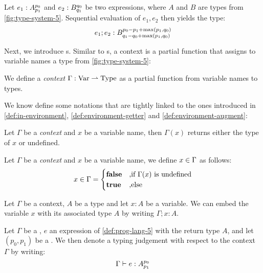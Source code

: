 \begin{definition}
   Let \(e_1 : A ^{p_0}_{p_1}\) and \(e_2 : B ^{q_0}_{q_1}\) be two expressions, where \(A\) and \(B\) are types from \cref{fig:type-system-5}. Sequential evaluation of \(e_1, e_2\) then yields the type:
   \[
      e_1;e_2 : B ^{p_0 - p_1 + \max(p_1, q_0)}_{q_1 - q_0 + \max(p_1, q_0)}
   \]
\end{definition}

Next, we introduce s. Similar to s, a context is a partial function that assigns to variable names a type from \cref{fig:type-system-5}:

\begin{definition}[Context]\label{def:context}
   We define a \emph{context} \(\Gamma : \text{Var} \rightharpoonup \text{Type}\) as a partial function from variable names to types.
\end{definition}

We know define some notations that are tightly linked to the ones introduced in \cref{def:in-environment}, \cref{def:environment-getter} and \cref{def:environment-augment}:


\begin{definition}\label{def:context-getter}
   Let \(\Gamma\) be a \emph{context} and \(x\) be a variable name, then \(\Gamma(x)\) returns either the type of \(x\) or undefined.
\end{definition}

\begin{definition}\label{def:in-context}
   Let \(\Gamma\) be a \emph{context} and \(x\) be a variable name, we define \(x \in \Gamma\) as follows:
   \[
      x \in \Gamma =
      \begin{cases}
	 \mathbf{false}	     & \text{,if } \Gamma(x) \text{ is undefined}\\
	 \mathbf{true}	     & \text{,else}
      \end{cases}
   \]
\end{definition}

\begin{definition}\label{def:context-augment}
   Let \(\Gamma\) be a context, \(A\) be a type and let \(x : A\) be a variable. We can embed the variable \(x\) with its associated type \(A\) by writing \(\Gamma ; x:A\).
\end{definition}

\begin{definition}\label{def:type-judgement-context}
   Let \(\Gamma\) be a , \(e\) an expression of \cref{def:prog-lang-5} with the return type \(A\), and let \((p_0, p_1)\) be a . We then denote a typing judgement with respect to the context \(\Gamma\) by writing:
   \[
      \Gamma \vdash e : A ^{p_0}_{p_1}
   \]
\end{definition}

